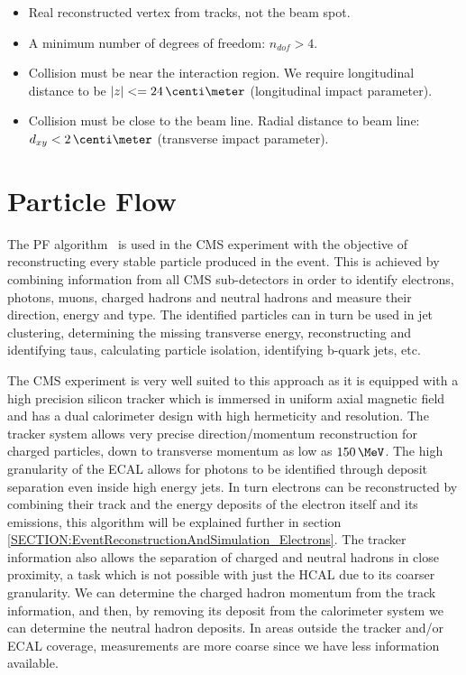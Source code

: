 \begin{itemize}
  \item Real reconstructed vertex from tracks, not the beam spot.
  \item A minimum number of degrees of freedom: $n_{dof}>4$.
  \item Collision must be near the interaction region. We require longitudinal distance to be $|z|<=24\,\centi\meter$ (longitudinal impact parameter).
  \item Collision must be close to the beam line. Radial distance to beam line: $d_{xy}<2\,\centi\meter$ (transverse impact parameter). 
\end{itemize}

\section{Particle Flow}
\label{SECTION:EventReconstructionAndSimulation_ParticleFlow}


The \gls{PF} algorithm~\cite{ARTICLE:CMSComissioningOfParticleFlow, ARTICLE:CMSParticleFlowEventRecontruction, ARTICLE:CMSComissioningOfParticleFlowWithMinBias} is used in the \gls{CMS} experiment with the objective of reconstructing every stable particle produced in the event. This is achieved by combining information from all \gls{CMS} sub-detectors in order to identify electrons, photons, muons, charged hadrons and neutral hadrons and measure their direction, energy and type. The identified particles can in turn be used in jet clustering, determining the missing transverse energy, reconstructing and identifying taus, calculating particle isolation, identifying b-quark jets, etc.

The \gls{CMS} experiment is very well suited to this approach as it is equipped with a high precision silicon tracker which is immersed in uniform axial magnetic field and has a dual calorimeter design with high hermeticity and resolution. The tracker system allows very precise direction/momentum reconstruction for charged particles, down to transverse momentum as low as $150\,\MeV$. The high granularity of the \gls{ECAL} allows for photons to be identified through deposit separation even inside high energy jets. In turn electrons can be reconstructed by combining their track and the energy deposits of the electron itself and its emissions, this algorithm will be explained further in section \ref{SECTION:EventReconstructionAndSimulation_Electrons}. The tracker information also allows the separation of charged and neutral hadrons in close proximity, a task which is not possible with just the \gls{HCAL} due to its coarser granularity. We can determine the charged hadron momentum from the track information, and then, by removing its deposit from the calorimeter system we can determine the neutral hadron deposits. In areas outside the tracker and/or \gls{ECAL} coverage, measurements are more coarse since we have less information available.

